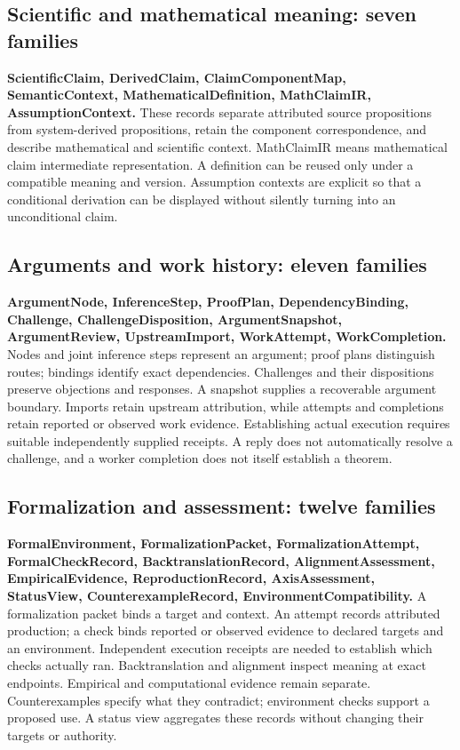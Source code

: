 \subsection{Scientific and mathematical meaning: seven families}

\textbf{ScientificClaim, DerivedClaim, ClaimComponentMap, SemanticContext, MathematicalDefinition, MathClaimIR, AssumptionContext.} These records separate attributed source propositions from system-derived propositions, retain the component correspondence, and describe mathematical and scientific context. MathClaimIR means mathematical claim intermediate representation. A definition can be reused only under a compatible meaning and version. Assumption contexts are explicit so that a conditional derivation can be displayed without silently turning into an unconditional claim.

\subsection{Arguments and work history: eleven families}

\textbf{ArgumentNode, InferenceStep, ProofPlan, DependencyBinding, Challenge, ChallengeDisposition, ArgumentSnapshot, ArgumentReview, UpstreamImport, WorkAttempt, WorkCompletion.} Nodes and joint inference steps represent an argument; proof plans distinguish routes; bindings identify exact dependencies. Challenges and their dispositions preserve objections and responses. A snapshot supplies a recoverable argument boundary. Imports retain upstream attribution, while attempts and completions retain reported or observed work evidence. Establishing actual execution requires suitable independently supplied receipts. A reply does not automatically resolve a challenge, and a worker completion does not itself establish a theorem.

\subsection{Formalization and assessment: twelve families}

\textbf{FormalEnvironment, FormalizationPacket, FormalizationAttempt, FormalCheckRecord, BacktranslationRecord, AlignmentAssessment, EmpiricalEvidence, ReproductionRecord, AxisAssessment, StatusView, CounterexampleRecord, EnvironmentCompatibility.} A formalization packet binds a target and context. An attempt records attributed production; a check binds reported or observed evidence to declared targets and an environment. Independent execution receipts are needed to establish which checks actually ran. Backtranslation and alignment inspect meaning at exact endpoints. Empirical and computational evidence remain separate. Counterexamples specify what they contradict; environment checks support a proposed use. A status view aggregates these records without changing their targets or authority.

